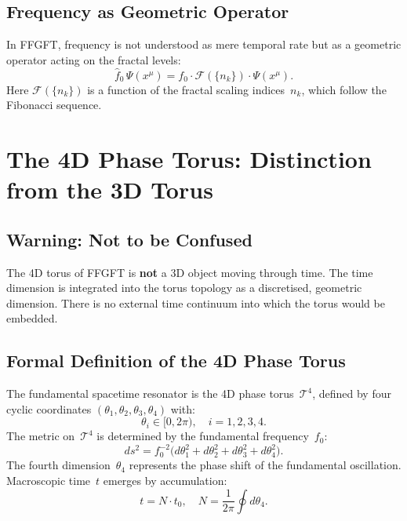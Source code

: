 \subsection{Frequency as Geometric Operator}

In FFGFT, frequency is not understood as mere temporal rate but as a
geometric operator acting on the fractal levels:
\begin{equation}
  \hat{f}_0\,\Psi(x^\mu) = f_0 \cdot \mathcal{F}(\{n_k\}) \cdot \Psi(x^\mu).
\end{equation}
Here $\mathcal{F}(\{n_k\})$ is a function of the fractal scaling
indices~$n_k$, which follow the Fibonacci sequence.

\section{The 4D Phase Torus: Distinction from the 3D Torus}

\subsection{Warning: Not to be Confused}

\begin{warnbox}
The 4D torus of FFGFT is \textbf{not} a 3D object moving through time.
The time dimension is integrated into the torus topology as a discretised,
geometric dimension. There is no external time continuum into which the
torus would be embedded.
\end{warnbox}

\subsection{Formal Definition of the 4D Phase Torus}

The fundamental spacetime resonator is the 4D phase torus~$\mathcal{T}^4$,
defined by four cyclic coordinates $(\theta_1, \theta_2, \theta_3,
\theta_4)$ with:
\begin{equation}
  \theta_i \in [0, 2\pi),\quad i = 1,2,3,4.
\end{equation}
The metric on~$\mathcal{T}^4$ is determined by the fundamental
frequency~$f_0$:
\begin{equation}
  ds^2 = f_0^{-2}
         \bigl(d\theta_1^2 + d\theta_2^2 + d\theta_3^2 + d\theta_4^2\bigr).
  \label{eq:metric}
\end{equation}
The fourth dimension~$\theta_4$ represents the phase shift of the
fundamental oscillation. Macroscopic time~$t$ emerges by accumulation:
\begin{equation}
  t = N \cdot t_0, \quad N = \frac{1}{2\pi}\oint d\theta_4.
\end{equation}

